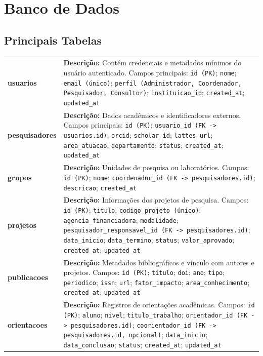 \documentclass[12pt,a4paper]{article}
\begin{document}
\section{Banco de Dados}
\subsection{Principais Tabelas}
\begin{longtable}{p{4cm} p{10cm}}
\textbf{usuarios} & \textbf{Descrição:} Contém credenciais e metadados mínimos do usuário autenticado. Campos principais: \texttt{id (PK)}; \texttt{nome}; \texttt{email (único)}; \texttt{perfil (Administrador, Coordenador, Pesquisador, Consultor)}; \texttt{instituicao\_id}; \texttt{created\_at}; \texttt{updated\_at} \\
\textbf{pesquisadores} & \textbf{Descrição:} Dados acadêmicos e identificadores externos. Campos principais: \texttt{id (PK)}; \texttt{usuario\_id (FK -> usuarios.id)}; \texttt{orcid}; \texttt{scholar\_id}; \texttt{lattes\_url}; \texttt{area\_atuacao}; \texttt{departamento}; \texttt{status}; \texttt{created\_at}; \texttt{updated\_at} \\
\textbf{grupos} & \textbf{Descrição:} Unidades de pesquisa ou laboratórios. Campos: \texttt{id (PK)}; \texttt{nome}; \texttt{coordenador\_id (FK -> pesquisadores.id)}; \texttt{descricao}; \texttt{created\_at} \\
\textbf{projetos} & \textbf{Descrição:} Informações dos projetos de pesquisa. Campos: \texttt{id (PK)}; \texttt{titulo}; \texttt{codigo\_projeto (único)}; \texttt{agencia\_financiadora}; \texttt{modalidade}; \texttt{pesquisador\_responsavel\_id (FK -> pesquisadores.id)}; \texttt{data\_inicio}; \texttt{data\_termino}; \texttt{status}; \texttt{valor\_aprovado}; \texttt{created\_at}; \texttt{updated\_at} \\
\textbf{publicacoes} & \textbf{Descrição:} Metadados bibliográficos e vínculo com autores e projetos. Campos: \texttt{id (PK)}; \texttt{titulo}; \texttt{doi}; \texttt{ano}; \texttt{tipo}; \texttt{periodico}; \texttt{issn}; \texttt{url}; \texttt{fator\_impacto}; \texttt{area\_conhecimento}; \texttt{created\_at}; \texttt{updated\_at} \\
\textbf{orientacoes} & \textbf{Descrição:} Registros de orientações acadêmicas. Campos: \texttt{id (PK)}; \texttt{aluno}; \texttt{nivel}; \texttt{titulo\_trabalho}; \texttt{orientador\_id (FK -> pesquisadores.id)}; \texttt{coorientador\_id (FK -> pesquisadores.id, opcional)}; \texttt{data\_inicio}; \texttt{data\_conclusao}; \texttt{status}; \texttt{created\_at}; \texttt{updated\_at} \\

\end{longtable}
\end{document}
